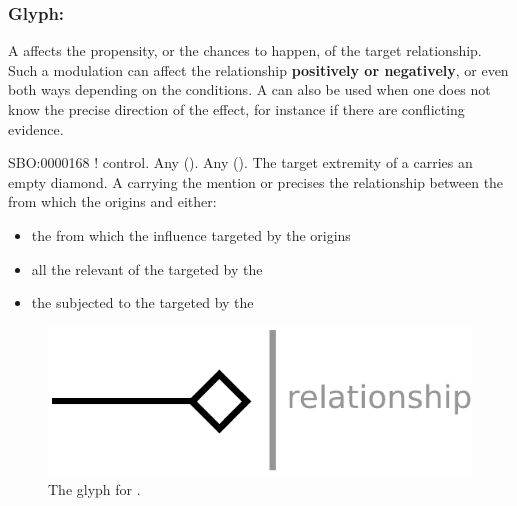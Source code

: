 \subsubsection{Glyph: }\label{sec:modulation}

A  affects the propensity, or the chances to happen, of the target relationship. Such a modulation can affect the relationship \textbf{positively or negatively}, or even both ways depending on the conditions. A  can also be used when one does not know the precise direction of the effect, for instance if there are conflicting evidence.

\begin{glyphDescription}
 \glyphSboTerm SBO:0000168 ! control.
 \glyphOrigin Any  ().
 \glyphTarget Any  ().
 \glyphEndPoint The target extremity of a  carries an empty diamond.
 \glyphAux A  carrying the mention  or  precises the relationship between the  from which the  origins and either:
\begin{itemize}
\item the  from which the influence targeted by the  origins
\item all the relevant  of the  targeted by the 
\item the  subjected to the  targeted by the 
\end{itemize}
 \end{glyphDescription}

\begin{figure}[H]
  \centering
  \includegraphics[scale = 0.5]{images/modulation}
  \caption{The \ER glyph for .}
  \label{fig:modulation}
\end{figure}
 


